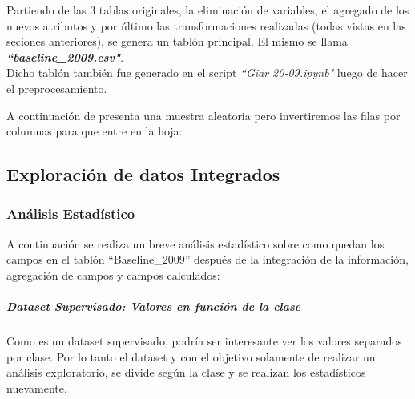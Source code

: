 Partiendo de las 3 tablas originales, la eliminación de variables, el agregado de los nuevos atributos y por último las transformaciones realizadas (todas vistas en las seciones anteriores), se genera un tablón principal. El mismo se llama \textbf{\textit{``baseline\_2009.csv"}}. \\

Dicho tablón también fue generado en el script \textit{``Giar 20-09.ipynb"} luego de hacer el preprocesamiento.

A continuación de presenta una muestra aleatoria pero invertiremos las filas por columnas para que entre en la hoja:







\subsection{Exploración de datos Integrados}

\hypertarget{anuxe1lisis-estaduxedstico}{%
	\subsubsection{Análisis Estadístico}\label{anuxe1lisis-estaduxedstico}}

A continuación se realiza un breve análisis estadístico sobre como
quedan los campos en el tablón ``Baseline\_2009'' después de la
integración de la información, agregación de campos y campos calculados:










\clearpage

\hypertarget{dataset-supervisado-valores-en-funciuxf3n-de-la-clase}{%
	\subparagraph{\underline{Dataset Supervisado: Valores en función de la clase}}\label{dataset-supervisado-valores-en-funciuxf3n-de-la-clase}}


Como es un dataset supervisado, podría ser interesante ver los valores
separados por clase. Por lo tanto el dataset y con el objetivo solamente
de realizar un análisis exploratorio, se divide según la clase y se
realizan los estadísticos nuevamente.

